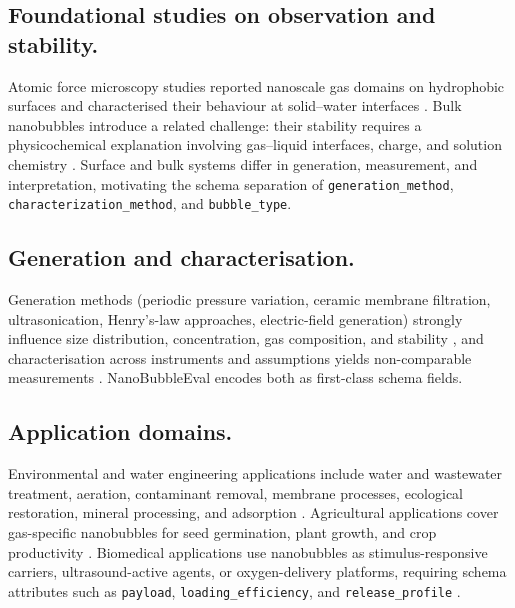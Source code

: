 \documentclass{article}
\begin{document}
\subsection{Foundational studies on observation and stability.}
Atomic force microscopy studies reported nanoscale gas domains on
hydrophobic surfaces and characterised their behaviour at solid--water
interfaces \citep{Lou2000NanobubblesSolid,Tyrrell2001ImagesNanobubbles,Zhang2008NanobubblesInterface,Borkent2007SuperstabilitySurface}.
Bulk nanobubbles introduce a related challenge: their stability
requires a physicochemical explanation involving gas--liquid
interfaces, charge, and solution chemistry
\citep{Ohgaki2009PhysicochemicalApproach,Jadhav2020BulkNanobubbles,Tan2020BulkNanobubbles,Zhou2021GenerationStability,Tan2021StabilitySurface}.
Surface and bulk systems differ in generation, measurement, and
interpretation, motivating the schema separation of
\texttt{generation\_method}, \texttt{characterization\_method}, and
\texttt{bubble\_type}.

\subsection{Generation and characterisation.}
Generation methods (periodic pressure variation, ceramic membrane
filtration, ultrasonication, Henry's-law approaches, electric-field
generation) strongly influence size distribution, concentration, gas
composition, and stability
\citep{Wang2019GenerationStability,Ahmed2018GenerationNanobubbles,Yasuda2018GenerationReduction,Ferraro2020HenryMethod,Ghaani2020MassiveGeneration},
and characterisation across instruments and assumptions yields
non-comparable measurements
\citep{Zhang2020ExperimentalStudy,Zhou2020UltrahighDensity,Li2021BulkNanobubbles,Meegoda2019ApplicationDiffused}.
NanoBubbleEval encodes both as first-class schema fields.

\subsection{Application domains.}
Environmental and water engineering applications include water and
wastewater treatment, aeration, contaminant removal, membrane
processes, ecological restoration, mineral processing, and adsorption
\citep{Jia2023NanobubblesWater,Zhou2022UntappedPotential,Azevedo2019BulkNanobubbles,Kyzas2018NanobubblesEffect}.
Agricultural applications cover gas-specific nanobubbles for seed
germination, plant growth, and crop productivity
\citep{Ahmed2018InfluencesOxygen,Wu2019EnhancementTomato,Wang2021NanobubblesPromote}.
Biomedical applications use nanobubbles as stimulus-responsive
carriers, ultrasound-active agents, or oxygen-delivery platforms,
requiring schema attributes such as \texttt{payload},
\texttt{loading\_efficiency}, and \texttt{release\_profile}
\citep{Xiong2021StimuliResponsive,Su2021CurrentAdvances,Batchelor2020NestedNanobubbles,Song2020BiogenicNanobubbles,DuanL2020MicroNano}.
\end{document}
